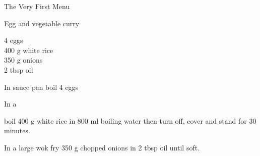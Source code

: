 \begin{menu}{The Very First Menu}
    \begin{recipe}{2}{Egg and vegetable curry}%
    
		\begin{ingredients}
		4  eggs  \\
	400 g white rice  \\
	350 g onions  \\
	2 tbsp oil  \\
	
		\end{ingredients}
	
    \begin{instructions}
    \item 
				In sauce pan boil
				4   eggs\item 
      In a 
       
      boil 
      400 g  white rice
      in 
      800 ml  boiling water
      then turn off, cover and stand for 30 minutes.
    \item 
        In a large wok fry
        350 g chopped onions
        in
        2 tbsp  oil
        until soft.
      
    \end{instructions}
    \end{recipe}%
  
    \clearpage
    \end{menu}
	
